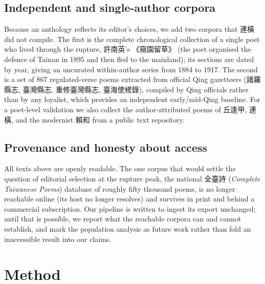 \documentclass[10pt,twocolumn]{article}
\begin{document}
\subsection{Independent and single-author corpora}
Because an anthology reflects its editor's choices, we add two corpora that \mbox{連橫} did
not compile. The first is the complete chronological collection of a single poet who lived
through the rupture, \mbox{許南英}'s \mbox{《窺園留草》} (the poet organised the defence of
Tainan in 1895 and then fled to the mainland); its sections are dated by year, giving an
uncurated within-author series from 1884 to 1917. The second is a set of 867 regulated-verse
poems extracted from official Qing gazetteers (\mbox{諸羅縣志}, \mbox{臺灣縣志},
\mbox{重修臺灣縣志}, \mbox{臺海使槎錄}), compiled by Qing officials rather than by any
loyalist, which provides an independent early/mid-Qing baseline. For a poet-level validation
we also collect the author-attributed poems of \mbox{丘逢甲}, \mbox{連橫}, and the modernist
\mbox{賴和} from a public text repository.

\subsection{Provenance and honesty about access}
All texts above are openly readable. The one corpus that would settle the question of
editorial selection at the rupture peak, the national \mbox{全臺詩} (\emph{Complete Taiwanese
Poems}) database of roughly fifty thousand poems, is no longer reachable online (its host no
longer resolves) and survives in print and behind a commercial subscription. Our pipeline is
written to ingest its export unchanged; until that is possible, we report what the reachable
corpora can and cannot establish, and mark the population analysis as future work rather than
fold an inaccessible result into our claims.

\section{Method}
\end{document}
